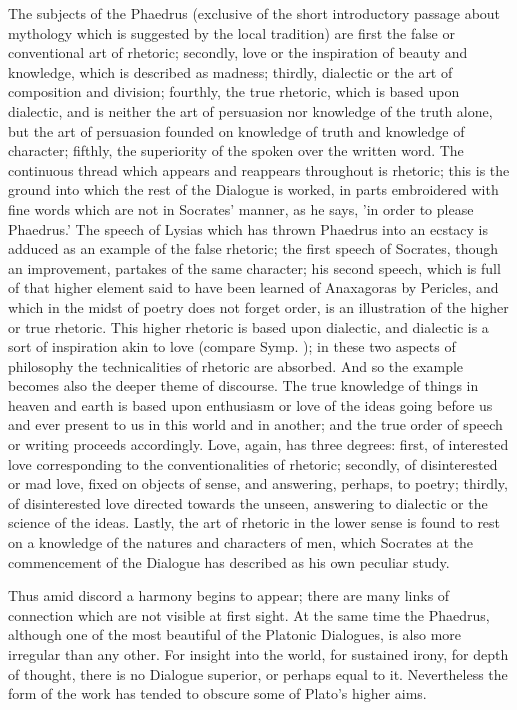 \documentclass[11pt,letter]{article}
\begin{document}
\par  The subjects of the Phaedrus (exclusive of the short introductory passage about mythology which is suggested by the local tradition) are first the false or conventional art of rhetoric; secondly, love or the inspiration of beauty and knowledge, which is described as madness; thirdly, dialectic or the art of composition and division; fourthly, the true rhetoric, which is based upon dialectic, and is neither the art of persuasion nor knowledge of the truth alone, but the art of persuasion founded on knowledge of truth and knowledge of character; fifthly, the superiority of the spoken over the written word. The continuous thread which appears and reappears throughout is rhetoric; this is the ground into which the rest of the Dialogue is worked, in parts embroidered with fine words which are not in Socrates' manner, as he says, 'in order to please Phaedrus.' The speech of Lysias which has thrown Phaedrus into an ecstacy is adduced as an example of the false rhetoric; the first speech of Socrates, though an improvement, partakes of the same character; his second speech, which is full of that higher element said to have been learned of Anaxagoras by Pericles, and which in the midst of poetry does not forget order, is an illustration of the higher or true rhetoric. This higher rhetoric is based upon dialectic, and dialectic is a sort of inspiration akin to love (compare Symp. ); in these two aspects of philosophy the technicalities of rhetoric are absorbed. And so the example becomes also the deeper theme of discourse. The true knowledge of things in heaven and earth is based upon enthusiasm or love of the ideas going before us and ever present to us in this world and in another; and the true order of speech or writing proceeds accordingly. Love, again, has three degrees: first, of interested love corresponding to the conventionalities of rhetoric; secondly, of disinterested or mad love, fixed on objects of sense, and answering, perhaps, to poetry; thirdly, of disinterested love directed towards the unseen, answering to dialectic or the science of the ideas. Lastly, the art of rhetoric in the lower sense is found to rest on a knowledge of the natures and characters of men, which Socrates at the commencement of the Dialogue has described as his own peculiar study.

\par  Thus amid discord a harmony begins to appear; there are many links of connection which are not visible at first sight. At the same time the Phaedrus, although one of the most beautiful of the Platonic Dialogues, is also more irregular than any other. For insight into the world, for sustained irony, for depth of thought, there is no Dialogue superior, or perhaps equal to it. Nevertheless the form of the work has tended to obscure some of Plato's higher aims.
\end{document}
